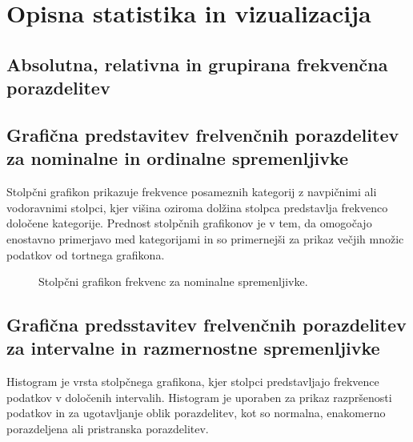 \section{Opisna statistika in vizualizacija}

\subsection*{Absolutna, relativna in grupirana frekvenčna porazdelitev}

\subsection*{Grafična predstavitev frelvenčnih porazdelitev za nominalne in ordinalne spremenljivke}

Stolpčni grafikon prikazuje frekvence posameznih kategorij z navpičnimi ali vodoravnimi stolpci, kjer višina oziroma dolžina stolpca predstavlja frekvenco določene kategorije. Prednost stolpčnih grafikonov je v tem, da omogočajo enostavno primerjavo med kategorijami in so primernejši za prikaz večjih množic podatkov od tortnega grafikona.

\begin{figure}
    \centering
    \caption{Stolpčni grafikon frekvenc za nominalne spremenljivke.}
    \end{figure}

\subsection*{Grafična predsstavitev frelvenčnih porazdelitev za intervalne in razmernostne spremenljivke}

Histogram je vrsta stolpčnega grafikona, kjer stolpci predstavljajo frekvence podatkov v določenih intervalih. Histogram je uporaben za prikaz razpršenosti podatkov in za ugotavljanje oblik porazdelitev, kot so normalna, enakomerno porazdeljena ali pristranska porazdelitev.

